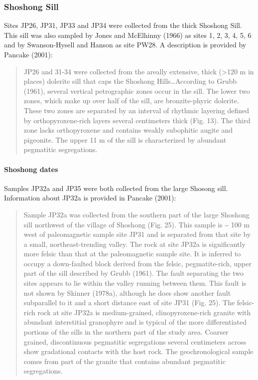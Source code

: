 \documentclass{article}
\begin{document}
    \subsubsection{Shoshong Sill}\label{shoshong-sill}

    Sites JP26, JP31, JP33 and JP34 were collected from the thick Shoshong
Sill. This sill was also sampled by Jones and McElhinny (1966) as sites
1, 2, 3, 4, 5, 6 and by Swanson-Hysell and Hanson as site PW28. A
description is provided by Pancake (2001):

\begin{quote}
JP26 and 31-34 were collected from the areally extensive, thick
(\textgreater{}120 m in places) dolerite sill that caps the Shoshong
Hills\ldots{}According to Grubb (1961), several vertical petrographic
zones occur in the sill. The lower two zones, which make up over half of
the sill, are bronzite-phyric dolerite. These two zones are separated by
an interval of rhythmic layering defined by orthopyroxene-rich layers
several centimeters thick (Fig. 13). The third zone lacks orthopyroxene
and contains weakly subophitic augite and pigeonite. The upper 11 m of
the sill is characterized by abundant pegmatitic segregations.
\end{quote}

    \paragraph{Shoshong dates}\label{shoshong-dates}

    Samples JP32a and JP35 were both collected from the large Shosong sill.
Information about JP32a is provided in Pancake (2001):

\begin{quote}
Sample JP32a was collected from the southern part of the large Shoshong
sill northwest of the village of Shoshong (Fig. 25). This sample is
\textasciitilde{} 100 m west of paleomagnetic sample site JP31 and is
separated from that site by a small, northeast-trending valley. The rock
at site JP32a is significantly more felsic than that at the
paleomagnetic sample site. It is inferred to occupy a down-faulted block
derived from the felsic, pegmatite-rich, upper part of the sill
described by Grubb (1961). The fault separating the two sites appears to
lie within the valley running between them. This fault is not shown by
Skinner (1978a), although he does show another fault subparallel to it
and a short distance east of site JP31 (Fig. 25). The felsic-rich rock
at site JP32a is medium-grained, clinopyroxene-rich granite with
abundant interstitial granophyre and is typical of the more
differentiated portions of the sills in the northern part of the study
area. Coarser grained, discontinuous pegmatitic segregations several
centimeters across show gradational contacts with the host rock. The
geochronological sample comes from part of the granite that contains
abundant pegmatitic segregations.
\end{quote}
\end{document}
